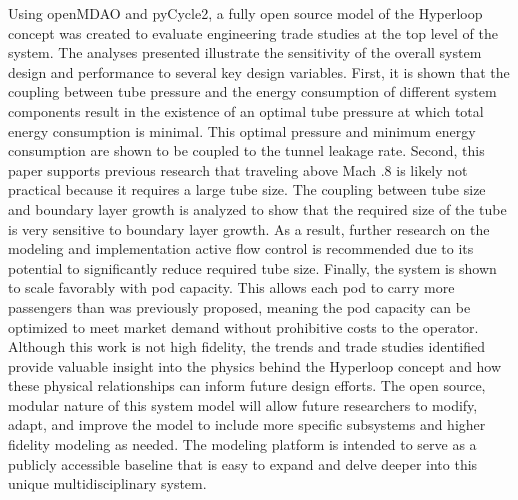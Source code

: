 Using openMDAO and pyCycle2, a fully open source model of the Hyperloop concept was created to evaluate engineering trade studies at the top level of the system. The analyses presented illustrate the sensitivity of the overall system design and performance to several key design variables. First, it is shown that the coupling between tube pressure and the energy consumption of different system components result in the existence of an optimal tube pressure at which total energy consumption is minimal. This optimal pressure and minimum energy consumption are shown to be coupled to the tunnel leakage rate. Second, this paper supports previous research that traveling above Mach .8 is likely not practical because it requires a large tube size. The coupling between tube size and boundary layer growth is analyzed to show that the required size of the tube is very sensitive to boundary layer growth. As a result, further research on the modeling and implementation active flow control is recommended due to its potential to significantly reduce required tube size. Finally, the system is shown to scale favorably with pod capacity. This allows each pod to carry more passengers than was previously proposed, meaning the pod capacity can be optimized to meet market demand without prohibitive costs to the operator. Although this work is not high fidelity, the trends and trade studies identified provide valuable insight into the physics behind the Hyperloop concept and how these physical relationships can inform future design efforts. The open source, modular nature of this system model will allow future researchers to modify, adapt, and improve the model to include more specific subsystems and higher fidelity modeling as needed. The modeling platform is intended to serve as a publicly accessible baseline that is easy to expand and delve deeper into this unique multidisciplinary system.